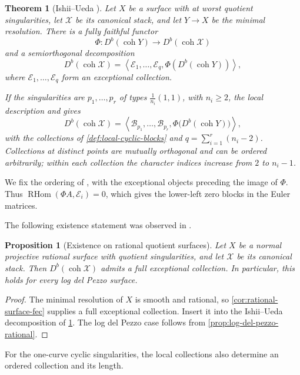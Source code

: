 \documentclass[11pt]{article}
\theoremstyle{plain}
\newtheorem{theorem}{Theorem}[section]
\newtheorem{proposition}[proposition]{Proposition}
\theoremstyle{definition}
\theoremstyle{remark}
\newcommand{\Db}{D^b}
\newcommand{\coh}{\operatorname{coh}}
\newcommand{\RHom}{\operatorname{RHom}}
\newcommand{\XX}{\mathcal X}
\begin{document}
\begin{theorem}[Ishii--Ueda {\cite[Theorems~1.4 and~3.1]{Ishii2015}}]\label{thm:ishii-ueda-global}
Let \(X\) be a surface with at worst quotient singularities, let \(\XX\) be its canonical stack, and let \(Y\to X\) be the minimal resolution. There is a fully faithful functor
\[
\Phi:\Db(\coh Y)\to \Db(\coh \XX)
\]
and a semiorthogonal decomposition
\[
\Db(\coh \XX)
=
\left\langle
\mathcal E_1,\dots,\mathcal E_q,\Phi(\Db(\coh Y))
\right\rangle,
\]
where \(\mathcal E_1,\dots,\mathcal E_q\) form an exceptional collection.

If the singularities are \(p_1,\ldots,p_r\) of types
\(\frac1{n_i}(1,1)\), with \(n_i\geq2\), the local description
\cite[Theorem~3.1]{Ishii2015} and
\cite[Example~2.6]{GugiattiRota2023} gives
\[
\Db(\coh\XX)=
\left\langle
\mathscr B_{p_1},\ldots,\mathscr B_{p_r},
\Phi\bigl(\Db(\coh Y)\bigr)
\right\rangle,
\]
with the collections of \cref{def:local-cyclic-blocks} and
\(q=\sum_{i=1}^r(n_i-2)\). Collections at distinct points are mutually
orthogonal and can be ordered arbitrarily; within each collection the
character indices increase from \(2\) to \(n_i-1\).
\end{theorem}

We fix the ordering of \cite[Theorem~1.4]{Ishii2015}, with the exceptional
objects preceding the image of \(\Phi\). Thus
\(\RHom(\Phi A,\mathcal E_i)=0\), which gives the lower-left zero blocks
in the Euler matrices.

The following existence statement was observed in
\cite[Remark~4.8]{GugiattiRota2023}.

\begin{proposition}[Existence on rational quotient surfaces]
\label{prop:stack-existence}
Let \(X\) be a normal projective rational surface with quotient
singularities, and let \(\XX\) be its canonical stack. Then \(\Db(\coh\XX)\) admits a full
exceptional collection. In particular, this holds for every log del
Pezzo surface.
\end{proposition}

\begin{proof}
The minimal resolution of \(X\) is smooth and rational, so
\cref{cor:rational-surface-fec} supplies a full exceptional collection.
Insert it into the Ishii--Ueda decomposition of
\cref{thm:ishii-ueda-global}. The log del Pezzo case follows from
\cref{prop:log-del-pezzo-rational}.
\end{proof}

For the one-curve cyclic singularities, the local collections also determine
an ordered collection and its length.
\end{document}
